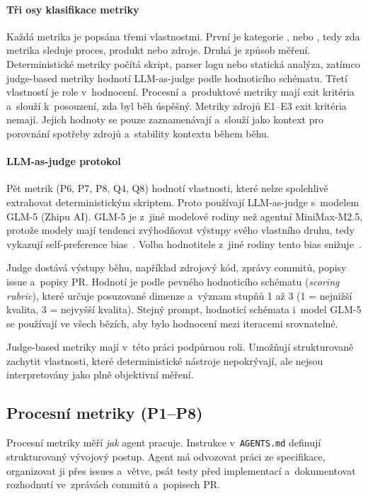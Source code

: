 \paragraph{Tři osy klasifikace metriky}
Každá metrika je popsána třemi vlastnostmi. První je kategorie
,  nebo , tedy zda metrika sleduje proces,
produkt nebo zdroje. Druhá je způsob měření. Deterministické metriky
počítá skript, parser logu nebo statická analýza, zatímco
judge-based metriky hodnotí LLM-as-judge podle hodnoticího schématu. Třetí
vlastností je role v~hodnocení. Procesní a~produktové metriky mají
exit kritéria a~slouží k~posouzení, zda byl běh úspěšný. Metriky
zdrojů \acs{E1}--\acs{E3} exit kritéria nemají. Jejich hodnoty se
pouze zaznamenávají a~slouží jako kontext pro porovnání spotřeby
zdrojů a~stability kontextu během běhu.

\paragraph{LLM-as-judge protokol}
\label{sec:llm-as-judge-aplikace}%
Pět metrik (\acs{P6}, \acs{P7}, \acs{P8}, \acs{Q4}, \acs{Q8})
hodnotí vlastnosti, které nelze spolehlivě extrahovat
deterministickým skriptem. Proto používají LLM-as-judge s~modelem
GLM-5 (Zhipu AI). GLM-5 je z~jiné modelové rodiny než agentní
MiniMax-M2.5, protože modely mají tendenci zvýhodňovat výstupy svého
vlastního druhu, tedy vykazují self-preference bias~\cite{panickssery2024}.
Volba hodnotitele z~jiné rodiny tento bias snižuje~\cite{verga2024poll}.

Judge dostává výstupy běhu, například zdrojový kód, zprávy commitů,
popisy issue a~popisy PR. Hodnotí je podle pevného hodnoticího schématu
(\textit{scoring rubric}), které určuje posuzované dimenze a~význam
stupňů 1 až 3 (1 = nejnižší kvalita, 3 = nejvyšší kvalita). Stejný
prompt, hodnoticí schémata i~model GLM-5 se používají ve všech bězích,
aby bylo hodnocení mezi iteracemi srovnatelné.

Judge-based metriky mají v~této práci podpůrnou roli. Umožňují
strukturovaně zachytit vlastnosti, které deterministické nástroje
nepokrývají, ale nejsou interpretovány jako plně objektivní měření.

\subsection{Procesní metriky (P1--P8)}
\label{sec:procesni-metriky}

Procesní metriky měří \textit{jak} agent pracuje.
Instrukce v~\texttt{AGENTS.md} definují strukturovaný vývojový postup. Agent
má odvozovat práci ze specifikace, organizovat ji přes issues
a~větve, psát testy před implementací a~dokumentovat rozhodnutí
ve~zprávách commitů a~popisech PR.


